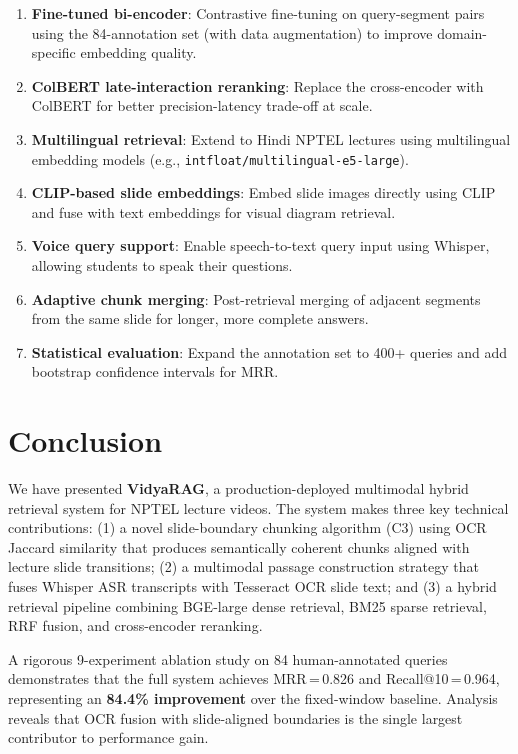 \documentclass[12pt,a4paper]{article}
\begin{document}
\begin{enumerate}[leftmargin=1.5em]
  \item \textbf{Fine-tuned bi-encoder}: Contrastive fine-tuning on query-segment pairs using the 84-annotation set (with data augmentation) to improve domain-specific embedding quality.
  \item \textbf{ColBERT late-interaction reranking}: Replace the cross-encoder with ColBERT for better precision-latency trade-off at scale.
  \item \textbf{Multilingual retrieval}: Extend to Hindi NPTEL lectures using multilingual embedding models (e.g., \texttt{intfloat/multilingual-e5-large}).
  \item \textbf{CLIP-based slide embeddings}: Embed slide images directly using CLIP and fuse with text embeddings for visual diagram retrieval.
  \item \textbf{Voice query support}: Enable speech-to-text query input using Whisper, allowing students to speak their questions.
  \item \textbf{Adaptive chunk merging}: Post-retrieval merging of adjacent segments from the same slide for longer, more complete answers.
  \item \textbf{Statistical evaluation}: Expand the annotation set to 400+ queries and add bootstrap confidence intervals for MRR.
\end{enumerate}

\newpage

\section{Conclusion}

We have presented \textbf{VidyaRAG}, a production-deployed multimodal hybrid retrieval system for NPTEL lecture videos. The system makes three key technical contributions: (1) a novel slide-boundary chunking algorithm (C3) using OCR Jaccard similarity that produces semantically coherent chunks aligned with lecture slide transitions; (2) a multimodal passage construction strategy that fuses Whisper ASR transcripts with Tesseract OCR slide text; and (3) a hybrid retrieval pipeline combining BGE-large dense retrieval, BM25 sparse retrieval, RRF fusion, and cross-encoder reranking.

A rigorous 9-experiment ablation study on 84 human-annotated queries demonstrates that the full system achieves MRR\,=\,0.826 and Recall@10\,=\,0.964, representing an \textbf{84.4\% improvement} over the fixed-window baseline. Analysis reveals that OCR fusion with slide-aligned boundaries is the single largest contributor to performance gain.
\end{document}
